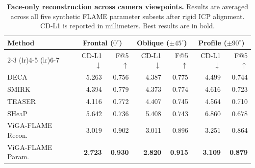 \begin{table}[t]
\centering
\scriptsize
\setlength{\tabcolsep}{3.0pt}
\renewcommand{\arraystretch}{0.95}
\caption{\textbf{Face-only reconstruction across camera viewpoints.}
Results are averaged across all five synthetic FLAME parameter subsets after rigid ICP alignment.
CD-L1 is reported in millimeters. Best results are in bold.}
\label{tab:cross_viewpoint}
\begin{tabular}{@{}lrrrrrr@{}}
\toprule
\multirow{2}{*}{Method} &
\multicolumn{2}{c}{Frontal ($0^\circ$)} &
\multicolumn{2}{c}{Oblique  ($\pm45^\circ$)} &
\multicolumn{2}{c}{Profile ($\pm90^\circ$)} \\
\cmidrule(lr){2-3}
\cmidrule(lr){4-5}
\cmidrule(lr){6-7}
&
CD-L1$\downarrow$ & F@5$\uparrow$ &
CD-L1$\downarrow$ & F@5$\uparrow$ &
CD-L1$\downarrow$ & F@5$\uparrow$ \\

\midrule
DECA~\cite{feng2021deca}
& 5.263 & 0.756
& 4.387 & 0.775
& 4.499 & 0.744 \\
SMIRK~\cite{filntisis2024smirk}
& 4.394 & 0.779
& 4.373 & 0.774
& 4.616 & 0.723 \\
TEASER~\cite{liu2025teaser}
& 4.116 & 0.772
& 4.407 & 0.745
& 4.564 & 0.710 \\
SHeaP~\cite{schoneveld2025sheap}
& 5.642 & 0.736
& 5.408 & 0.743
& 6.860 & 0.678 \\
\midrule
ViGA-FLAME Recon.
& 3.019 & 0.902
& 3.011 & 0.896
& 3.251 & 0.864 \\
ViGA-FLAME Param.
& \textbf{2.723} & \textbf{0.930}
& \textbf{2.820} & \textbf{0.915}
& \textbf{3.109} & \textbf{0.879} \\
\bottomrule

\end{tabular}
\end{table}